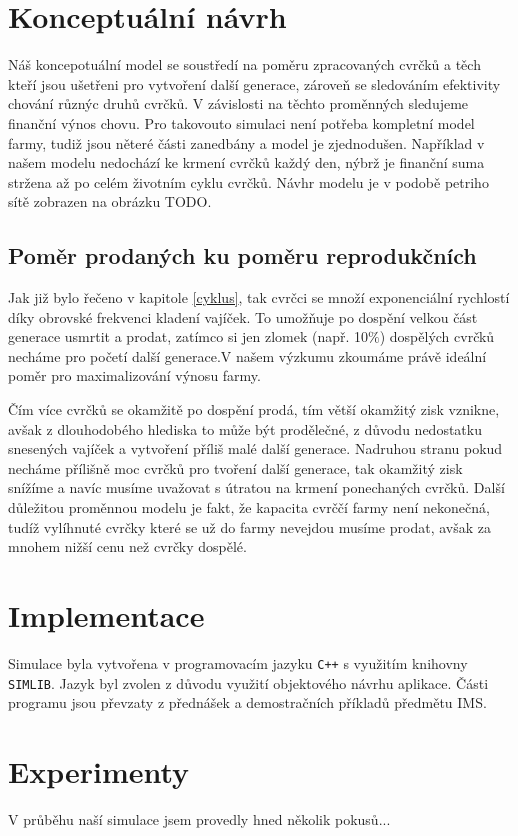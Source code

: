 \documentclass[a4paper, 12pt]{article}
\begin{document}
\newpage

\section{Konceptuální návrh}
Náš koncepotuální model se soustředí na poměru zpracovaných cvrčků a těch kteří jsou ušetřeni pro vytvoření další generace, zároveň se sledováním efektivity chování různýc druhů cvrčků. V závislosti na těchto proměnných sledujeme finanční výnos chovu. Pro takovouto simulaci není potřeba kompletní model farmy, tudiž jsou něteré části zanedbány a model je zjednodušen. Například v našem modelu nedochází ke krmení cvrčků každý den, nýbrž je finanční suma stržena až po celém životním cyklu cvrčků. Návhr modelu je v podobě petriho sítě zobrazen na obrázku TODO.

\subsection{Poměr prodaných ku poměru reprodukčních} %
Jak již bylo řečeno v kapitole \ref{cyklus}, tak cvrčci se množí exponenciální rychlostí díky obrovské frekvenci kladení vajíček. To umožňuje po dospění velkou část generace usmrtit a prodat, zatímco si jen zlomek (např. 10$\%$) dospělých cvrčků necháme pro početí další generace.V našem výzkumu zkoumáme právě ideální poměr pro maximalizování výnosu farmy. 

Čím více cvrčků se okamžitě po dospění prodá, tím větší okamžitý zisk vznikne, avšak z dlouhodobého hlediska to může být prodělečné, z důvodu nedostatku snesených vajíček a vytvoření příliš malé další generace. Nadruhou stranu pokud necháme přílišně moc cvrčků pro tvoření další generace, tak okamžitý zisk snížíme a navíc musíme uvažovat s útratou na krmení ponechaných cvrčků. Další důležitou proměnnou modelu je fakt, že kapacita cvrččí farmy není nekonečná, tudíž vylíhnuté cvrčky které se už do farmy nevejdou musíme prodat, avšak za mnohem nižší cenu než cvrčky dospělé.

\section{Implementace}
Simulace byla vytvořena v programovacím jazyku \texttt{C++} s využitím knihovny \texttt{SIMLIB}. Jazyk byl zvolen z důvodu využití objektového návrhu aplikace. Části programu jsou převzaty z přednášek a demostračních příkladů předmětu IMS. 

\section{Experimenty}
V průběhu naší simulace jsem provedly hned několik pokusů...
\end{document}
